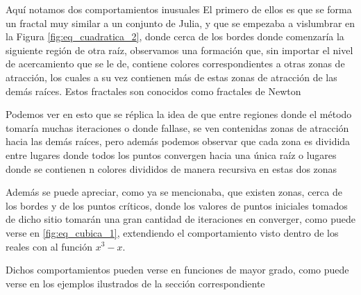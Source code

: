 Aquí notamos dos comportamientos inusuales
El primero de ellos es que se forma un fractal muy similar a un conjunto de Julia\cite{badger}, y que se empezaba a vislumbrar en la Figura \ref{fig:eq_cuadratica_2}, donde cerca de los bordes donde comenzaría la siguiente región de otra raíz, observamos una formación que, sin importar el nivel de acercamiento que se le de, contiene colores correspondientes a otras zonas de atracción, los cuales a su vez contienen más de estas zonas de atracción de las demás raíces. Estos fractales son conocidos como fractales de Newton \cite{3b1b}

Podemos ver en esto que se réplica la idea de que entre regiones donde el método tomaría muchas iteraciones o donde fallase, se ven contenidas zonas de atracción hacia las demás raíces, pero además podemos observar que cada zona es dividida entre lugares donde todos los puntos convergen hacia una única raíz o lugares donde se contienen n colores divididos de manera recursiva en estas dos zonas

Además se puede apreciar, como ya se mencionaba, que existen zonas, cerca de los bordes y de los puntos críticos, donde los valores de puntos iniciales tomados de dicho sitio tomarán una gran cantidad de iteraciones en converger, como puede verse en \ref{fig:eq_cubica_1}, extendiendo el comportamiento visto dentro de los reales con al función $x^3-x$.

Dichos comportamientos pueden verse en funciones de mayor grado, como puede verse en los ejemplos ilustrados de la sección correspondiente